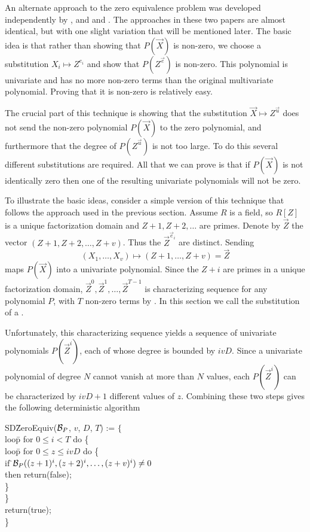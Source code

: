 An alternate approach to the zero equivalence problem was developed 
independently by {\Grigoriev}, {\Karpinski} and {\Singer} 
\cite{Grigoriev90} and {\Zippel} \cite{Zippel90}.  The approaches in 
these two papers are almost 
identical, but with one slight variation that will be mentioned later.
The basic idea is that rather than showing that $P(\vec{X})$ is
non-zero, we choose a substitution $X_i \mapsto Z^{e_i}$ and show that
$P(Z^{\vec{e}})$ is non-zero.  This polynomial is univariate and has no
more non-zero terms than the original multivariate polynomial.
Proving that it is non-zero is relatively easy.

The crucial part of this technique is showing that the substitution
$\vec{X} \mapsto Z^{\vec{u}}$ does not send the non-zero polynomial
$P(\vec{X})$ to the zero polynomial, and furthermore that the degree
of $P(Z^{\vec{u}})$ is not too large.  To do this several different
substitutions are required.  All that we can prove is that if
$P(\vec{X})$ is not identically zero then one of the resulting
univariate polynomials will not be zero.

To illustrate the basic ideas, consider a simple version of this
technique that follows the approach used in the previous section.
Assume $R$ is a field, so $R[Z]$ is a unique factorization domain and
$Z+1, Z+2, \ldots$ are primes. Denote by $\vec{Z}$ the vector $(Z+1,
Z+2, \ldots, Z+v)$.  Thus the $\vec{Z}^{\vec{e}_i}$ are distinct.
Sending
\begin{equation}\label{Zero:LinearSubs:Eq}
(X_1, \ldots, X_v) \mapsto (Z+1, \ldots, Z+v) = \vec{Z}
\end{equation}
maps $P(\vec{X})$ into a univariate polynomial.  Since the $Z+i$ are
primes in a unique factorization domain, $\vec{Z}^0, \vec{Z}^1,
\ldots, \vec{Z}^{T-1}$ is characterizing sequence for any polynomial
$P$, with $T$ non-zero terms by .  In this
section we call the substitution of  a
.

Unfortunately, this characterizing sequence yields a sequence of
univariate polynomials $P(\vec{Z}^i)$, each of whose degree is bounded
by $ivD$.  Since a univariate polynomial of degree $N$ cannot vanish
at more than $N$ values, each $P(\vec{Z}^i)$ can be characterized by
$ivD+1$ different values of $z$.  Combining these two steps gives the
following deterministic algorithm

\begindsacode
SD\=ZeroEquiv(${\cal B}_P$, $v$, $D$, $T$) := $\{$\\
\>loo\=p for $0 \le i < T$ do \{ \\
\>\> loo\=p for $0 \le z \le ivD$ do \{ \\
\>\>\> if \=${\cal B}_P((z+1)^i, (z+2)^i, \ldots, (z+v)^i) \not= 0$ \\
\>\>\>\>then return(false); \\
\>\>\> \}\\
\>\> \}\\
\> return(true); \\
\> \}
\enddsacode

